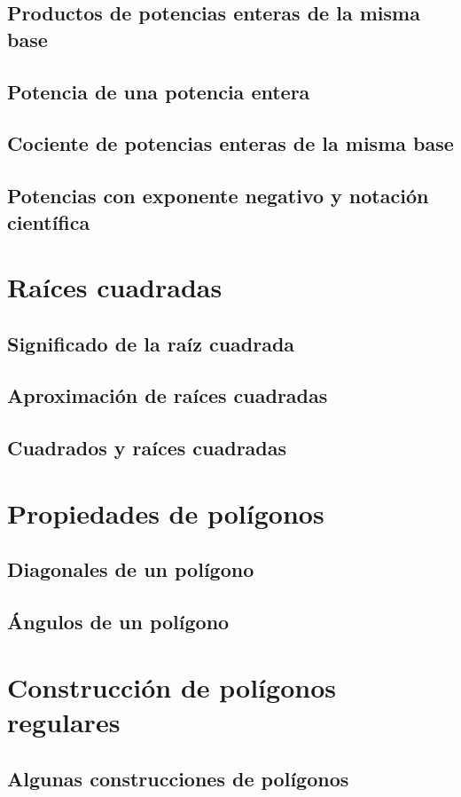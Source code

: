 \documentclass[11pt]{book}
\begin{document}
\subsection{Productos de potencias enteras de la misma base}
\subsection{Potencia de una potencia entera}
\subsection{Cociente de potencias enteras de la misma base}
\subsection{Potencias con exponente negativo y notación científica}

\section{Raíces cuadradas}
\subsection{Significado de la raíz cuadrada}
\subsection{Aproximación de raíces cuadradas}
\subsection{Cuadrados y raíces cuadradas}

\section{Propiedades de polígonos}
\subsection{Diagonales de un polígono}
\subsection{Ángulos de un polígono}

\section{Construcción de polígonos regulares}
\subsection{Algunas construcciones de polígonos}
\end{document}
